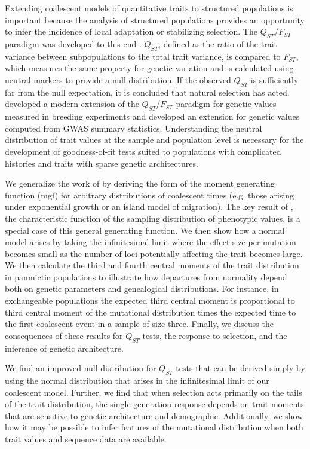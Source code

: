 Extending coalescent models of quantitative traits to structured populations is
important because the analysis of structured populations provides an opportunity
to infer the incidence of local adaptation or stabilizing selection. The
$Q_{ST}$/$F_{ST}$ paradigm was developed to this end
\citep{Whitlock2008,Spitze1993}. $Q_{ST}$, defined as the ratio of the trait
variance between subpopulations to the total trait variance, is compared to
$F_{ST}$, which measures the same property for genetic variation and is
calculated using neutral markers to provide a null distribution. If the observed
$Q_{ST}$ is sufficiently far from the null expectation, it is concluded that
natural selection has acted. \citet{Ovaskainen2011} developed a modern extension
of the $Q_{ST}$/$F_{ST}$ paradigm for genetic values measured in breeding
experiments and \citet{Berg2014} developed an extension for genetic values
computed from GWAS summary statistics. Understanding the neutral distribution of
trait values at the sample and population level is necessary for the development
of goodness-of-fit tests suited to populations with complicated histories and
traits with sparse genetic architectures.

We generalize the work of \citet{Schraiber2015} by deriving the form of the
moment generating function (mgf) for arbitrary distributions of coalescent times
(e.g. those arising under exponential growth or an island model of migration).
The key result of \citet{Schraiber2015}, the characteristic function of the
sampling distribution of phenotypic values, is a special case of this general
generating function. We then show how a normal model arises by taking the
infinitesimal limit where the effect size per mutation becomes small as the
number of loci potentially affecting the trait becomes large. We then calculate
the third and fourth central moments of the trait distribution in panmictic
populations to illustrate how departures from normality depend both on genetic
parameters and genealogical distributions. For instance, in exchangeable
populations the expected third central moment is proportional to third central
moment of the mutational distribution times the expected time to the first
coalescent event in a sample of size three. Finally, we discuss the consequences
of these results for $Q_{ST}$ tests, the response to selection, and the
inference of genetic architecture.

We find an improved null distribution for $Q_{ST}$ tests that can be derived
simply by using the normal distribution that arises in the infinitesimal limit
of our coalescent model. Further, we find that when selection acts primarily on
the tails of the trait distribution, the single generation response depends on
trait moments that are sensitive to genetic architecture and demographic.
Additionally, we show how it may be possible to infer features of the mutational
distribution when both trait values and sequence data are available.

